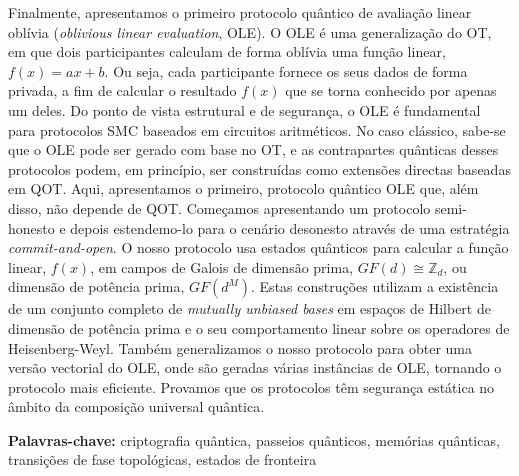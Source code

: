 Finalmente, apresentamos o primeiro protocolo quântico de  avaliação linear oblívia (\textit{oblivious linear evaluation}, OLE). O OLE é uma generalização do OT, em que dois participantes calculam de forma oblívia uma função linear, $f(x) = ax + b$. Ou seja, cada participante fornece os seus dados de forma privada, a fim de calcular o resultado $f(x)$ que se torna conhecido por apenas um deles. Do ponto de vista estrutural e de segurança, o OLE é fundamental para protocolos SMC baseados em circuitos aritméticos. No caso clássico, sabe-se que o OLE pode ser gerado com base no OT, e as contrapartes quânticas desses protocolos podem, em princípio, ser construídas como extensões directas baseadas em QOT. Aqui, apresentamos o primeiro, protocolo quântico OLE que, além disso, não depende de QOT. Começamos apresentando um protocolo semi-honesto e depois estendemo-lo para o cenário desonesto através de uma estratégia \textit{commit-and-open}. O nosso protocolo usa estados quânticos para calcular a função linear, $f(x)$, em campos de Galois de dimensão prima, $GF(d) \cong \mathbb{Z}_d$, ou dimensão de potência prima, $GF(d^M)$. Estas construções utilizam a existência de um conjunto completo de \textit{mutually unbiased bases} em espaços de Hilbert de dimensão de potência prima e o seu comportamento linear sobre os operadores de Heisenberg-Weyl. Também generalizamos o nosso protocolo para obter uma versão vectorial do OLE, onde são geradas várias instâncias de OLE, tornando o protocolo mais eficiente. Provamos que os protocolos têm segurança estática no âmbito da composição universal quântica.

\vfill
\begin{flushleft}
\textbf{Palavras-chave:} criptografia qu\^{a}ntica, passeios qu\^{a}nticos, mem\'{o}rias qu\^{a}nticas, transi\c{c}\~{o}es de fase topol\'{o}gicas, estados de fronteira
\end{flushleft}
